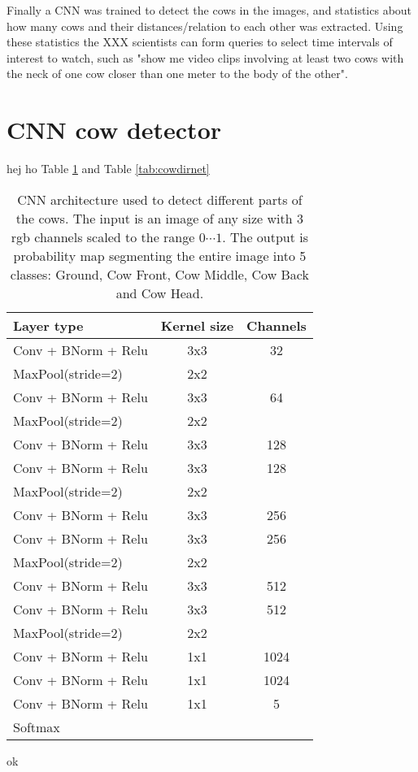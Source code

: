 \documentclass[10pt,a4paper,twocolumn]{article}
\begin{document}
Finally a CNN was trained to detect the cows in the images, and statistics about how many cows and their distances/relation to each other was extracted. Using these statistics the XXX scientists can form queries to select time intervals of interest to watch, such as "show me video clips involving at least two cows with the neck of one cow closer than one meter to the body of the other".

\section{CNN cow detector}

hej ho Table \ref{tab:cownet} and Table \ref{tab:cowdirnet}

\begin{table}
\begin{tabular}{|l|c|c|}
\hline 
\textbf{Layer type} & \textbf{Kernel size} & \textbf{Channels} \\ 
\hline 

Conv + BNorm + Relu & 3x3 & 32 \\ 
MaxPool(stride=2) & 2x2 &  \\ 
\hline 

Conv + BNorm + Relu & 3x3 & 64 \\ 
MaxPool(stride=2) & 2x2 &  \\ 
\hline 

Conv + BNorm + Relu & 3x3 & 128 \\ 
Conv + BNorm + Relu & 3x3 & 128 \\ 
MaxPool(stride=2) & 2x2 &  \\ 
\hline 

Conv + BNorm + Relu & 3x3 & 256 \\ 
Conv + BNorm + Relu & 3x3 & 256 \\ 
MaxPool(stride=2) & 2x2 &  \\ 
\hline 

Conv + BNorm + Relu & 3x3 & 512 \\ 
Conv + BNorm + Relu & 3x3 & 512 \\ 
MaxPool(stride=2) & 2x2 &  \\ 
\hline 

Conv + BNorm + Relu & 1x1 & 1024 \\ 
Conv + BNorm + Relu & 1x1 & 1024 \\ 
Conv + BNorm + Relu & 1x1 & 5 \\ 
Softmax & & \\
\hline 

\end{tabular} 
\caption{CNN architecture used to detect different parts of the cows. The input is an image of any size with 3 rgb channels scaled to the range $ 0\cdots1 $. The output is probability map segmenting the entire image into 5 classes: Ground, Cow Front, Cow Middle, Cow Back and Cow Head.}
\label{tab:cownet}
\end{table}
ok
\end{document}
